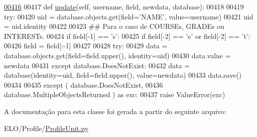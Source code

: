 \begin{DoxyCode}
\hypertarget{classProfile_1_1ProfileUnit_1_1PersProfile_l00416}{}\hyperlink{classProfile_1_1ProfileUnit_1_1PersProfile_af1e4b3cf0eee0a14b5113210503ff665}{00416} 
00417     \textcolor{keyword}{def }\hyperlink{classProfile_1_1ProfileUnit_1_1PersProfile_af1e4b3cf0eee0a14b5113210503ff665}{update}(self, username, field, newdata, database):
00418         
00419         \textcolor{keywordflow}{try}:
00420             uid = database.objects.get(field=\textcolor{stringliteral}{'NAME'}, value=username)
00421             uid = uid.identity
00422 
00423             \textcolor{comment}{## Para o caso de COURSEs, GRADEs ou INTERESTs.}
00424             \textcolor{keywordflow}{if} field[-1] == \textcolor{stringliteral}{'s'}:
00425                 \textcolor{keywordflow}{if} field[-2] == \textcolor{stringliteral}{'e'} \textcolor{keywordflow}{or} field[-2] == \textcolor{stringliteral}{'t'}:
00426                     field = field[:-1]
00427                 
00428             \textcolor{keywordflow}{try}:
00429                 data = database.objects.get(field=field.upper(), identity=uid)
00430                 data.value = newdata
00431             \textcolor{keywordflow}{except} database.DoesNotExist:
00432                 data = database(identity=uid, field=field.upper(), value=newdata)
00433             data.save()
00434 
00435         \textcolor{keywordflow}{except} ( database.DoesNotExist, 
00436                  database.MultipleObjectsReturned ) \textcolor{keyword}{as} exc:
00437             \textcolor{keywordflow}{raise} ValueError(exc)
\end{DoxyCode}


A documentação para esta classe foi gerada a partir do seguinte arquivo\-:\begin{DoxyCompactItemize}
\item 
E\-L\-O/\-Profile/\hyperlink{ProfileUnit_8py}{Profile\-Unit.\-py}\end{DoxyCompactItemize}
